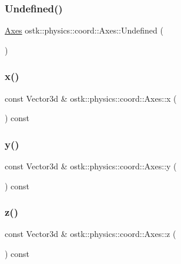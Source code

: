 \subsubsection{\texorpdfstring{Undefined()}{Undefined()}}
{\footnotesize\ttfamily \hyperlink{classostk_1_1physics_1_1coord_1_1_axes}{Axes} ostk\+::physics\+::coord\+::\+Axes\+::\+Undefined (\begin{DoxyParamCaption}{ }\end{DoxyParamCaption})\hspace{0.3cm}{\ttfamily [static]}}

\mbox{\label{classostk_1_1physics_1_1coord_1_1_axes_a3e982cbaeccbb99c2115fb30a46dd520}} 
\subsubsection{\texorpdfstring{x()}{x()}}
{\footnotesize\ttfamily const Vector3d \& ostk\+::physics\+::coord\+::\+Axes\+::x (\begin{DoxyParamCaption}{ }\end{DoxyParamCaption}) const}

\mbox{\label{classostk_1_1physics_1_1coord_1_1_axes_a5eb9d996136fc5fedd2db9410744af76}} 
\subsubsection{\texorpdfstring{y()}{y()}}
{\footnotesize\ttfamily const Vector3d \& ostk\+::physics\+::coord\+::\+Axes\+::y (\begin{DoxyParamCaption}{ }\end{DoxyParamCaption}) const}

\mbox{\label{classostk_1_1physics_1_1coord_1_1_axes_a56a219efa05ba3b614e1ae52b27ae8a6}} 
\subsubsection{\texorpdfstring{z()}{z()}}
{\footnotesize\ttfamily const Vector3d \& ostk\+::physics\+::coord\+::\+Axes\+::z (\begin{DoxyParamCaption}{ }\end{DoxyParamCaption}) const}



